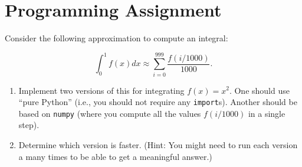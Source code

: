 \chapter{Programming Assignment}

Consider the following approximation to compute an integral:

\begin{equation}
\int_0^{1} f(x)dx \approx \sum_{i = 0}^{999} \frac{f(i/1000)}{1000}.
\end{equation}

\begin{enumerate}
\item Implement two versions of this for integrating $f(x) = x^2$. One should use ``pure Python'' (i.e., you should not require any \lstinline{import}s). Another should be based on \lstinline{numpy} (where you compute all the values $f(i/1000)$ in a single step).
\item Determine which version is faster. (Hint: You might need to run each version a many times to be able to get a meaningful answer.)
\end{enumerate}


